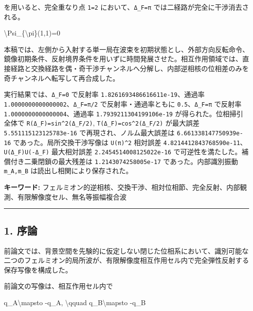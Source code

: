 \documentclass[
  a4paper,
]{article}
\newenvironment{Shaded}{}{}
\newcommand{\NormalTok}[1]{#1}
\begin{document}
を用いると、完全重なり点 \texttt{1=2} において、\texttt{Δ\_F=π}
では二経路が完全に干渉消去される。

\begin{Shaded}
\begin{Highlighting}[]
\NormalTok{\textbackslash{}Psi\_\{\textbackslash{}pi\}(1,1)=0}
\end{Highlighting}
\end{Shaded}

本稿では、左側から入射する単一局在波束を初期状態とし、外部方向反転命令、鏡像初期条件、反射境界条件を用いずに時間発展させた。相互作用領域では、直接経路と交換経路を偶・奇干渉チャンネルへ分解し、内部逆相核の位相差のみを奇チャンネルへ転写して再合成した。

実行結果では、\texttt{Δ\_F=0} で反射率
\texttt{1.8261693486616611e-19}、通過率
\texttt{1.0000000000000002}、\texttt{Δ\_F=π/2} で反射率・通過率ともに
\texttt{0.5}、\texttt{Δ\_F=π} で反射率
\texttt{1.0000000000000004}、通過率 \texttt{1.7939211304199106e-19}
が得られた。位相掃引全体で \texttt{R(Δ\_F)=sin\^{}2(Δ\_F/2)},
\texttt{T(Δ\_F)=cos\^{}2(Δ\_F/2)} が最大誤差
\texttt{5.551115123125783e-16} で再現され、ノルム最大誤差は
\texttt{6.661338147750939e-16} であった。局所交換干渉写像は
\texttt{U(π)\^{}2} 相対誤差
\texttt{4.8214412843768590e-11}、\texttt{U(Δ\_F)U(-Δ\_F)} 最大相対誤差
\texttt{2.2454514008125022e-16}
で可逆性を満たした。補償付き二乗閉鎖の最大残差は
\texttt{1.2143074258005e-17} であった。内部識別振動 \texttt{m\_A,m\_B}
は読出し相関により保存された。

\textbf{キーワード:}
フェルミオン的逆相核、交換干渉、相対位相節、完全反射、内部観測、有限解像度セル、無名等振幅複合波

\begin{center}\rule{0.5\linewidth}{0.5pt}\end{center}

\subsection{1. 序論}\label{ux5e8fux8ad6}

前論文では、背景空間を先験的に仮定しない閉じた位相系において、識別可能な二つのフェルミオン的局所波が、有限解像度相互作用セル内で完全弾性反射する保存写像を構成した。

前論文の写像は、相互作用セル内で

\begin{Shaded}
\begin{Highlighting}[]
\NormalTok{q\_A\textbackslash{}mapsto {-}q\_A,}
\NormalTok{\textbackslash{}qquad}
\NormalTok{q\_B\textbackslash{}mapsto {-}q\_B}
\end{Highlighting}
\end{Shaded}
\end{document}
